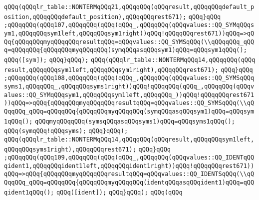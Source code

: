 \verb|qQQq(qQQqlr_table::NONTERMqQQq21,qQQqqQQq(qQQqresult,qQQqqQQqdefault_position,qQQqqQQqdefault_position),qQQqqQQqrest671);|\newline
\verb|qQQq}qQQq|\newline
\verb|;qQQqqQQq(qQQq107,qQQqqQQq(qQQq(qQQq_,qQQqqQQq(qQQqvalues::QQ_SYMqQQqsym1,qQQqqQQqsym1left,qQQqqQQqsym1right))qQQq!qQQqqQQqrest671))qQQq=>qQQq{qQQqqQQqmyqQQqqQQqresultqQQq=qQQqvalues::QQ_SYMSqQQq(\\qQQqqQQq_qQQq=qQQqqQQq{qQQqqQQqmyqQQqqQQq(symqQQqasqQQqsym1)qQQq=qQQqsym1qQQq();|\newline
\verb|qQQq([sym]);|\newline
\verb|qQQq}qQQq);|\newline
\verb|qQQq(qQQqlr_table::NONTERMqQQq14,qQQqqQQq(qQQq|\newline
\verb|result,qQQqqQQqsym1left,qQQqqQQqsym1right),qQQqqQQqrest671);|\newline
\verb|qQQq}qQQq|\newline
\verb|;qQQqqQQq(qQQq108,qQQqqQQq(qQQq(qQQq_,qQQqqQQq(qQQqvalues::QQ_SYMSqQQqsyms1,qQQqqQQq_,qQQqqQQqsyms1right))qQQq!qQQqqQQq(qQQq_,qQQqqQQq(qQQqvalues::QQ_SYMqQQqsym1,qQQqqQQqsym1left,qQQqqQQq_))qQQq!qQQqqQQqrest671))qQQq=>qQQq{qQQqqQQqmyqQQqqQQqresultqQQq=qQQqvalues::QQ_SYMSqQQq(\\qQQqqQQq_qQQq=qQQqqQQq{qQQqqQQqmyqQQqqQQq(symqQQqasqQQqsym1)qQQq=qQQqsym1qQQq();|\newline
\newline
\verb|qQQqmyqQQqqQQq(symsqQQqasqQQqsyms1)qQQq=qQQqsyms1qQQq();|\newline
\verb|qQQq(symqQQq!qQQqsyms);|\newline
\verb|qQQq}qQQq);|\newline
\verb|qQQq(qQQqlr_table::NONTERMqQQq14,qQQqqQQq(qQQqresult,qQQqqQQqsym1left,qQQqqQQqsyms1right),qQQqqQQqrest671);|\newline
\verb|qQQq}qQQq|\newline
\verb|;qQQqqQQq(qQQq109,qQQqqQQq(qQQq(qQQq_,qQQqqQQq(qQQqvalues::QQ_IDENTqQQqident1,qQQqqQQqident1left,qQQqqQQqident1right))qQQq!qQQqqQQqrest671))qQQq=>qQQq{qQQqqQQqmyqQQqqQQqresultqQQq=qQQqvalues::QQ_IDENTSqQQq(\\qQQqqQQq_qQQq=qQQqqQQq{qQQqqQQqmyqQQqqQQq(identqQQqasqQQqident1)qQQq=qQQqident1qQQq();|\newline
\verb|qQQq([ident]);|\newline
\verb|qQQq}qQQq);|\newline
\verb|qQQq(qQQq|\newline
